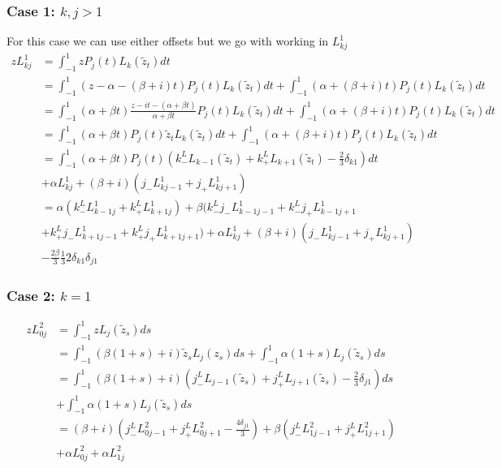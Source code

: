 \documentclass{article}
\begin{document}
\subsubsection{Case 1: $k,j>1$}
For this case we can use either offsets but we go with working in $L_{kj}^1$
\begin{align}
    zL_{kj}^1 &= \int_{-1}^1zP_j(t)L_k(\tilde{z}_t)dt\\
    &= \int_{-1}^1(z-\alpha-(\beta+i)t)P_j(t)L_k(\tilde{z}_t)dt
    +\int_{-1}^1(\alpha+(\beta+i)t)P_j(t)L_k(\tilde{z}_t)dt\\
    &= \int_{-1}^1(\alpha+\beta t)\frac{z-it-(\alpha+\beta t)}{\alpha+\beta t}P_j(t)L_k(\tilde{z}_t)dt
    +\int_{-1}^1(\alpha+(\beta+i)t)P_j(t)L_k(\tilde{z}_t)dt\\
    &= \int_{-1}^1(\alpha+\beta t)P_j(t)\tilde{z}_tL_k(\tilde{z}_t)dt
    +\int_{-1}^1(\alpha+(\beta+i)t)P_j(t)L_k(\tilde{z}_t)dt\\
    &= \int_{-1}^1(\alpha+\beta t)P_j(t)(k_-^LL_{k-1}(\tilde{z}_t)+k_+^LL_{k+1}(\tilde{z}_t)-\frac{2}{3}\delta_{k1})dt\\
    &+\alpha L_{kj}^1+(\beta+i)(j_-L_{kj-1}^1+j_+L_{kj+1}^1)\\
    &=\alpha(k_-^LL_{k-1j}^1+k_+^LL_{k+1j}^1)+
    \beta(k_-^Lj_-L_{k-1j-1}^1+k_-^Lj_+L_{k-1j+1}^1\\
    &+k_+^Lj_-L_{k+1j-1}^1+k_+^Lj_+L_{k+1j+1}^1)+\alpha L_{kj}^1+(\beta+i)(j_-L_{kj-1}^1+j_+L_{kj+1}^1)\\
    &-\frac{2\beta}{3}\frac{1}{3}2\delta_{k1}\delta_{j1}
\end{align}

\subsubsection{Case 2: $k=1$}
\begin{align}
    zL_{0j}^2&=\int_{-1}^1zL_j(\tilde z_s)ds\\
    &=\int_{-1}^1(\beta(1+s)+i)\tilde z_sL_j(z_s)ds+\int_{-1}^1\alpha(1+s)L_j(\tilde z_s)ds\\
    &=\int_{-1}^1(\beta(1+s)+i)(j_-^LL_{j-1}(\tilde z_s)+j_+^LL_{j+1}(\tilde z_s)-\frac{2}{3}\delta_{j1})ds\\
    &+\int_{-1}^1\alpha(1+s)L_j(\tilde z_s)ds\\
    &=(\beta+i)(j_-^LL_{0j-1}^2+j_+^LL_{0j+1}^2-\frac{4\delta_{j1}}{3})+\beta(j_-^LL_{1j-1}^2+j_+^LL_{1j+1}^2)\\
    &+\alpha L_{0j}^2+\alpha L_{1j}^2\\
\end{align}
\end{document}

